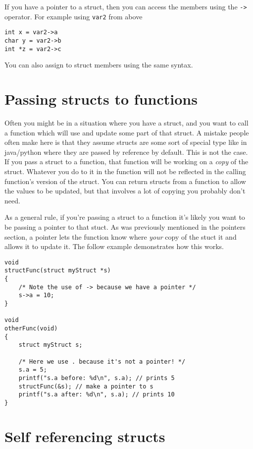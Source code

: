 If you have a pointer to a struct, then you can access the members using the \texttt{->} operator.
For example using \texttt{var2} from above

\begin{lstlisting}
int x = var2->a
char y = var2->b
int *z = var2->c
\end{lstlisting}

You can also assign to struct members using the same syntax.

\section{Passing structs to functions}

Often you might be in a situation where you have a struct, and you want to call a function which will use and update some part of that struct.
A mistake people often make here is that they assume structs are some sort of special type like in java/python where they are passed by reference by default.
This is not the case.
If you pass a struct to a function, that function will be working on a \emph{copy} of the struct.
Whatever you do to it in the function will not be reflected in the calling function's version of the struct.
You can return structs from a function to allow the values to be updated, but that involves a lot of copying you probably don't need.

As a general rule, if you're passing a struct to a function it's likely you want to be passing a pointer to that stuct.
As was previously mentioned in the pointers section, a pointer lets the function know where \emph{your} copy of the stuct it and allows it to update it.
The follow example demonstrates how this works.

\begin{lstlisting}
void
structFunc(struct myStruct *s)
{
    /* Note the use of -> because we have a pointer */
    s->a = 10;
}

void
otherFunc(void)
{
    struct myStruct s;

    /* Here we use . because it's not a pointer! */
    s.a = 5;
    printf("s.a before: %d\n", s.a); // prints 5
    structFunc(&s); // make a pointer to s
    printf("s.a after: %d\n", s.a); // prints 10
}
\end{lstlisting}

\section{Self referencing structs}

